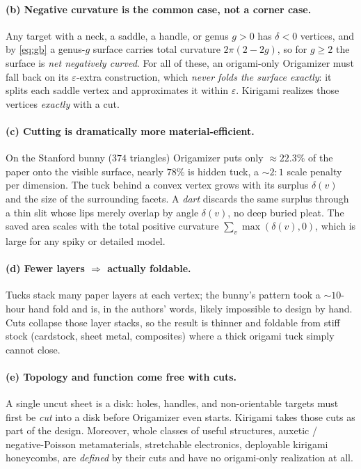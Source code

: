 \documentclass[11pt]{article}
\newcommand{\eps}{\varepsilon}
\newcommand{\defect}{\delta}
\begin{document}
\paragraph{(b) Negative curvature is the common case, not a corner case.}
Any target with a neck, a saddle, a handle, or genus $g>0$ has
$\defect<0$ vertices, and by \eqref{eq:gb} a genus-$g$ surface carries
total curvature $2\pi(2-2g)$, so for $g\ge 2$ the surface is \emph{net
negatively curved}. For all of these, an origami-only Origamizer must fall
back on its $\eps$-extra construction, which \emph{never folds the surface
exactly}: it splits each saddle vertex and approximates it within $\eps$.
Kirigami realizes those vertices \emph{exactly} with a cut.

\paragraph{(c) Cutting is dramatically more material-efficient.} On the
Stanford bunny ($374$ triangles) Origamizer puts only $\approx\!22.3\%$ of
the paper onto the visible surface, nearly $78\%$ is hidden tuck, a
$\sim\!2{:}1$ scale penalty per dimension. The tuck behind a convex vertex
grows with its surplus $\defect(v)$ and the size of the surrounding facets.
A \emph{dart} discards the same surplus through a thin slit whose lips
merely overlap by angle $\defect(v)$, no deep buried pleat. The saved
area scales with the total positive curvature $\sum_v\max(\defect(v),0)$,
which is large for any spiky or detailed model.

\paragraph{(d) Fewer layers $\Rightarrow$ actually foldable.} Tucks stack
many paper layers at each vertex; the bunny's pattern took a $\sim\!10$-hour
hand fold and is, in the authors' words, likely impossible to design by
hand. Cuts collapse those layer stacks, so the result is thinner and
foldable from stiff stock (cardstock, sheet metal, composites) where a
thick origami tuck simply cannot close.

\paragraph{(e) Topology and function come free with cuts.} A single uncut
sheet is a disk: holes, handles, and non-orientable targets must first be
\emph{cut} into a disk before Origamizer even starts. Kirigami takes those
cuts as part of the design. Moreover, whole classes of useful structures,
auxetic / negative-Poisson metamaterials, stretchable electronics,
deployable kirigami honeycombs, are \emph{defined} by their cuts and have
no origami-only realization at all.
\end{document}
